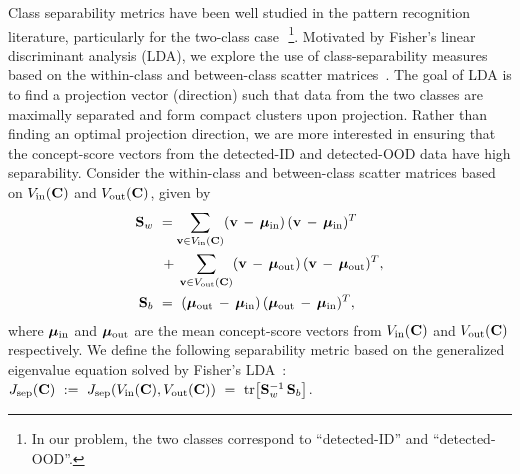  Class separability metrics have been well studied in the pattern recognition literature, particularly for the two-class case~\citep{fukunaga1990separ}\,\footnote{In our problem, the two classes correspond to ``detected-ID'' and ``detected-OOD''.}. 
%
Motivated by Fisher's linear discriminant analysis (LDA), we explore the use of class-separability measures based on the within-class and between-class scatter matrices~\citep{murphy2012separ}.
The goal of LDA is to find a projection vector (direction) such that data from the two classes are maximally separated and form compact clusters upon projection. 
Rather than finding an optimal projection direction, we are more interested in ensuring that the concept-score vectors from the detected-ID and detected-OOD data have high separability.
Consider the within-class and between-class scatter matrices based on $V_{\textrm{in}}(\mathbf{C})$ and $V_{\textrm{out}}(\mathbf{C})$, given by
\begin{align}
\label{eq:scatter_matrices}
\bfS_w ~&= \mysum_{\bfv \in V_{\textrm{in}}(\bfC)} (\bfv \,-\, \bfmu_{\textrm{in}})\,(\bfv \,-\, \bfmu_{\textrm{in}})^T \nonumber \\
&\,+\, \mysum_{\bfv \in V_{\textrm{out}}(\bfC)} (\bfv \,-\, \bfmu_{\textrm{out}})\,(\bfv \,-\, \bfmu_{\textrm{out}})^T, \\
%
\bfS_b ~&=~ (\bfmu_{\textrm{out}} \,-\, \bfmu_{\textrm{in}})\,(\bfmu_{\textrm{out}} \,-\, \bfmu_{\textrm{in}})^T,
\end{align}
where $\bm{\mu}_{\textrm{in}}$ and $\bm{\mu}_{\textrm{out}}$ are the mean concept-score vectors from $V_{\textrm{in}}(\mathbf{C})$ and $V_{\textrm{out}}(\mathbf{C})$ respectively.
We define the following separability metric based on the generalized eigenvalue equation solved by Fisher's LDA~\citep{fukunaga1990separ}: $J_{\textrm{sep}}(\mathbf{C}) ~:=~ J_{\textrm{sep}}(V_{\textrm{in}}(\mathbf{C}), V_{\textrm{out}}(\mathbf{C})) ~=~ \textrm{tr}\big[\mathbf{S}_w^{-1} \,\mathbf{S}_b\big]$.
%
\iffalse

